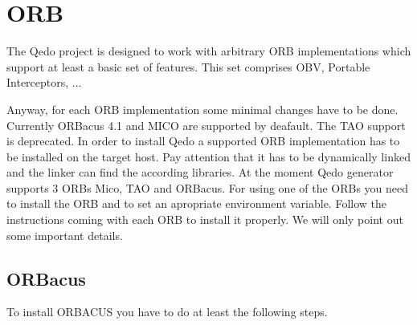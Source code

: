 \documentclass[12pt,a4paper]{report}
\begin{document}
\section{ORB}
\label{sec:ORB}
The Qedo project is designed to work with arbitrary ORB implementations which support at least a basic set of features. This set comprises OBV, Portable Interceptors, ... 

Anyway, for each ORB implementation some minimal changes have to be done. Currently ORBacus 4.1 and MICO are supported by deafault. The TAO support is deprecated. In order to install Qedo a supported ORB implementation has to be installed on the target host. Pay attention that it has to be dynamically linked and the linker can find the according libraries. At the moment Qedo generator supports 3 ORBs Mico, TAO and ORBacus. For using one of the ORBs you need to install the ORB and to set an apropriate environment variable. Follow the instructions coming with each ORB to install it properly. We will only point out some important details.

\subsection{ORBacus}
\label{sec:ORBacus}
To install ORBACUS you have to do at least the following steps.
\end{document}
